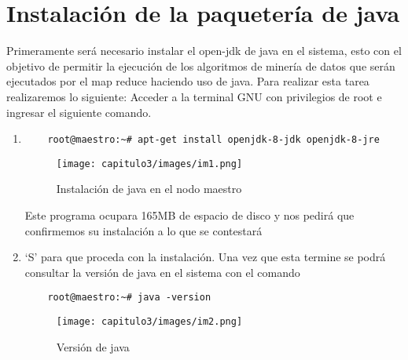 \section{Instalación de la paquetería de java}
Primeramente será necesario instalar el open-jdk de java en el sistema, esto con el objetivo de permitir la ejecución de los algoritmos de minería de datos que serán ejecutados por el map reduce haciendo uso de java. Para realizar esta tarea realizaremos lo siguiente:
Acceder a la terminal GNU con privilegios de root e ingresar el siguiente comando.

\begin{enumerate}
	\item
	\begin{lstlisting} 
	root@maestro:~# apt-get install openjdk-8-jdk openjdk-8-jre
 	\end{lstlisting}

\begin{figure}[!htbp]
	\hypertarget{fig:instalacionjava}{\hspace{1pt}}
	\begin{center}
		\texttt{[image: capitulo3/images/im1.png]}
		\caption{Instalación de java en el nodo maestro}
		\label{fig:instalacionjava}
	\end{center}
\end{figure}

Este programa ocupara 165MB de espacio de disco y nos pedirá que confirmemos su instalación a lo que se contestará 
	\item ‘S’ 
para que proceda con la instalación.
Una vez que esta termine se podrá consultar la versión de java en el sistema con el comando

	\begin{lstlisting} 
	root@maestro:~# java -version
 	\end{lstlisting}
 	
\begin{figure}[!htbp]
	\hypertarget{fig:instalacionjava2}{\hspace{1pt}}
	\begin{center}
		\texttt{[image: capitulo3/images/im2.png]}
		\caption{Versión de java}
		\label{fig:instalacionjava2}
	\end{center}
\end{figure}
\end{enumerate}

